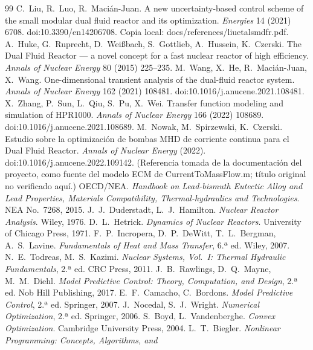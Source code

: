 \documentclass[11pt,a4paper]{article}
\newcommand{\codeus}{\textunderscore\allowbreak}
\newcommand{\code}[1]{{\small\ttfamily\let\_\codeus #1}}
\theoremstyle{plain}
\theoremstyle{definition}
\begin{document}
\begin{thebibliography}{99}\small
{} C.~Liu, R.~Luo, R.~Macián-Juan. A new uncertainty-based control scheme of the
  small modular dual fluid reactor and its optimization. \emph{Energies} 14 (2021) 6708.
  doi:10.3390/en14206708. Copia local: \code{docs/references/liuetal\_smdfr.pdf}.
 A.~Huke, G.~Ruprecht, D.~Weißbach, S.~Gottlieb, A.~Hussein, K.~Czerski. The
  Dual Fluid Reactor --- a novel concept for a fast nuclear reactor of high efficiency.
  \emph{Annals of Nuclear Energy} 80 (2015) 225--235.
 M.~Wang, X.~He, R.~Macián-Juan, X.~Wang. One-dimensional transient analysis
  of the dual-fluid reactor system. \emph{Annals of Nuclear Energy} 162 (2021) 108481.
  doi:10.1016/j.anucene.2021.108481.
 X.~Zhang, P.~Sun, L.~Qiu, S.~Pu, X.~Wei. Transfer function modeling and
  simulation of HPR1000. \emph{Annals of Nuclear Energy} 166 (2022) 108689.
  doi:10.1016/j.anucene.2021.108689.
 M.~Nowak, M.~Spirzewski, K.~Czerski. Estudio sobre la optimización de bombas
  MHD de corriente continua para el Dual Fluid Reactor. \emph{Annals of Nuclear Energy} (2022).
  doi:10.1016/j.anucene.2022.109142. (Referencia tomada de la documentación del proyecto, como
  fuente del modelo ECM de \code{CurrentToMassFlow.m}; título original no verificado aquí.)
 OECD/NEA. \emph{Handbook on Lead-bismuth Eutectic Alloy and Lead Properties,
  Materials Compatibility, Thermal-hydraulics and Technologies}. NEA No.~7268, 2015.
 J.~J.~Duderstadt, L.~J.~Hamilton. \emph{Nuclear Reactor Analysis}.
  Wiley, 1976.
 D.~L.~Hetrick. \emph{Dynamics of Nuclear Reactors}. University of Chicago
  Press, 1971.
 F.~P.~Incropera, D.~P.~DeWitt, T.~L.~Bergman, A.~S.~Lavine.
  \emph{Fundamentals of Heat and Mass Transfer}, 6.ª ed. Wiley, 2007.
 N.~E.~Todreas, M.~S.~Kazimi. \emph{Nuclear Systems, Vol.~I: Thermal
  Hydraulic Fundamentals}, 2.ª ed. CRC Press, 2011.
 J.~B.~Rawlings, D.~Q.~Mayne, M.~M.~Diehl. \emph{Model Predictive Control:
  Theory, Computation, and Design}, 2.ª ed. Nob Hill Publishing, 2017.
 E.~F.~Camacho, C.~Bordons. \emph{Model Predictive Control}, 2.ª ed.
  Springer, 2007.
 J.~Nocedal, S.~J.~Wright. \emph{Numerical Optimization}, 2.ª ed.
  Springer, 2006.
 S.~Boyd, L.~Vandenberghe. \emph{Convex Optimization}. Cambridge University
  Press, 2004.
 L.~T.~Biegler. \emph{Nonlinear Programming: Concepts, Algorithms, and
}
\end{thebibliography}
\end{document}

